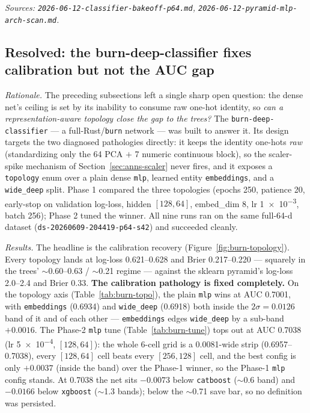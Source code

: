 \documentclass[11pt]{article}
\newcommand{\dsid}[1]{\texttt{\small #1}}
\begin{document}
\emph{Sources: \texttt{2026-06-12-classifier-bakeoff-p64.md},
\texttt{2026-06-12-pyramid-mlp-arch-scan.md}.}

\subsection{Resolved: the burn-deep-classifier fixes calibration but not the AUC gap}
\label{sec:anns-burn}
\emph{Rationale.} The preceding subsections left a single sharp open question:
the dense net's ceiling is set by its inability to consume raw one-hot identity,
so \emph{can a representation-aware topology close the gap to the trees?} The
\texttt{burn-deep-classifier} --- a full-Rust/\texttt{burn} network --- was built
to answer it. Its design targets the two diagnosed pathologies directly: it keeps
the identity one-hots \emph{raw} (standardizing only the 64 PCA $+$ 7 numeric
continuous block), so the scaler-spike mechanism of Section~\ref{sec:anns-scaler}
never fires, and it exposes a \texttt{topology} enum over a plain dense
\texttt{mlp}, learned entity \texttt{embeddings}, and a \texttt{wide\_deep} split.
Phase 1 compared the three topologies (epochs 250, patience 20, early-stop on
validation log-loss, hidden $[128,64]$, embed\_dim 8, lr \num{1e-3}, batch 256);
Phase 2 tuned the winner. All nine runs ran on the same full-64-d dataset
(\dsid{ds-20260609-204419-p64-s42}) and succeeded cleanly.

\emph{Results.} The headline is the calibration recovery
(Figure~\ref{fig:burn-topology}). Every topology lands at log-loss
\num{0.621}--\num{0.628} and Brier \num{0.217}--\num{0.220} --- squarely in the
trees' $\sim$0.60--0.63 / $\sim$0.21 regime --- against the sklearn pyramid's
log-loss \num{2.0}--\num{2.4} and Brier \num{0.33}. \textbf{The calibration
pathology is fixed completely.} On the topology axis (Table~\ref{tab:burn-topo}),
the plain \texttt{mlp} wins at AUC \num{0.7001}, with \texttt{embeddings}
(\num{0.6934}) and \texttt{wide\_deep} (\num{0.6918}) both inside the
$2\sigma=0.0126$ band of it and of each other --- \texttt{embeddings} edges
\texttt{wide\_deep} by a sub-band $+0.0016$. The Phase-2 \texttt{mlp} tune
(Table~\ref{tab:burn-tune}) tops out at AUC \num{0.7038} (lr \num{5e-4},
$[128,64]$): the whole 6-cell grid is a \num{0.0081}-wide strip
(\num{0.6957}--\num{0.7038}), every $[128,64]$ cell beats every $[256,128]$ cell,
and the best config is only $+0.0037$ (inside the band) over the Phase-1 winner,
so the Phase-1 \texttt{mlp} config stands. At \num{0.7038} the net sits
$-0.0073$ below \texttt{catboost} ($\sim$0.6 band) and $-0.0166$ below
\texttt{xgboost} ($\sim$1.3 bands); below the $\sim$0.71 save bar, so no
definition was persisted.
\end{document}
